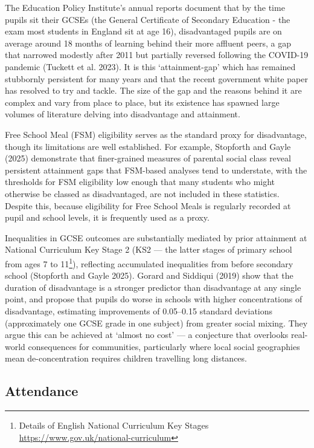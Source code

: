 \documentclass[
  12pt,
  titlepage]{article}
\begin{document}
The Education Policy Institute's annual reports document that by the
time pupils sit their GCSEs (the General Certificate of Secondary
Education - the exam most students in England sit at age 16),
disadvantaged pupils are on average around 18 months of learning behind
their more affluent peers, a gap that narrowed modestly after 2011 but
partially reversed following the COVID-19 pandemic (Tuckett et al.
2023). It is this `attainment-gap' which has remained stubbornly
persistent for many years and that the recent government white paper has
resolved to try and tackle. The size of the gap and the reasons behind
it are complex and vary from place to place, but its existence has
spawned large volumes of literature delving into disadvantage and
attainment.

Free School Meal (FSM) eligibility serves as the standard proxy for
disadvantage, though its limitations are well established. For example,
Stopforth and Gayle (2025) demonstrate that finer-grained measures of
parental social class reveal persistent attainment gaps that FSM-based
analyses tend to understate, with the thresholds for FSM eligibility low
enough that many students who might otherwise be classed as
disadvantaged, are not included in these statistics. Despite this,
because eligibility for Free School Meals is regularly recorded at pupil
and school levels, it is frequently used as a proxy.

Inequalities in GCSE outcomes are substantially mediated by prior
attainment at National Curriculum Key Stage 2 (KS2 --- the latter stages
of primary school from ages 7 to 11\footnote{Details of English National
  Curriculum Key Stages \url{https://www.gov.uk/national-curriculum}}),
reflecting accumulated inequalities from before secondary school
(Stopforth and Gayle 2025). Gorard and Siddiqui (2019) show that the
duration of disadvantage is a stronger predictor than disadvantage at
any single point, and propose that pupils do worse in schools with
higher concentrations of disadvantage, estimating improvements of
0.05--0.15 standard deviations (approximately one GCSE grade in one
subject) from greater social mixing. They argue this can be achieved at
`almost no cost' --- a conjecture that overlooks real-world consequences
for communities, particularly where local social geographies mean
de-concentration requires children travelling long distances.

\subsection{Attendance}\label{attendance}
\end{document}
